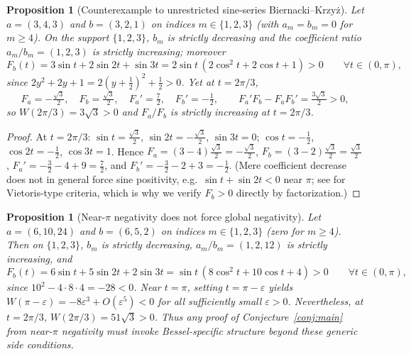 \documentclass[11pt]{article}
\newtheorem{proposition}[theorem]{Proposition}
\theoremstyle{remark}
\begin{document}
\begin{proposition}[Counterexample to unrestricted sine-series Biernacki--Krzy\.z]
\label{prop:counter}
Let $a = (3, 4, 3)$ and $b = (3, 2, 1)$ on indices $m \in \{1,2,3\}$ (with $a_m = b_m = 0$
for $m \ge 4$). On the support $\{1,2,3\}$, $b_m$ is strictly decreasing and the coefficient
ratio $a_m/b_m = (1,2,3)$ is strictly increasing; moreover
\[
F_b(t) = 3\sin t + 2\sin 2t + \sin 3t
= 2\sin t\,(2\cos^2 t + 2\cos t + 1) > 0 \qquad \forall t \in (0,\pi),
\]
since $2y^2 + 2y + 1 = 2(y + \tfrac{1}{2})^2 + \tfrac{1}{2} > 0$. Yet at $t = 2\pi/3$,
\[
F_a = -\tfrac{\sqrt{3}}{2},\quad
F_b = \tfrac{\sqrt{3}}{2},\quad
F_a' = \tfrac{7}{2},\quad
F_b' = -\tfrac{1}{2},
\qquad
F_a' F_b - F_a F_b' = \tfrac{3\sqrt{3}}{2} > 0,
\]
so $W(2\pi/3) = 3\sqrt{3} > 0$ and $F_a/F_b$ is strictly \emph{increasing} at $t = 2\pi/3$.
\end{proposition}

\begin{proof}
At $t = 2\pi/3$: $\sin t = \tfrac{\sqrt{3}}{2}$, $\sin 2t = -\tfrac{\sqrt{3}}{2}$,
$\sin 3t = 0$; $\cos t = -\tfrac{1}{2}$, $\cos 2t = -\tfrac{1}{2}$, $\cos 3t = 1$.
Hence $F_a = (3-4)\tfrac{\sqrt{3}}{2} = -\tfrac{\sqrt{3}}{2}$,
$F_b = (3-2)\tfrac{\sqrt{3}}{2} = \tfrac{\sqrt{3}}{2}$,
$F_a' = -\tfrac{3}{2} - 4 + 9 = \tfrac{7}{2}$, and
$F_b' = -\tfrac{3}{2} - 2 + 3 = -\tfrac{1}{2}$.
(Mere coefficient decrease does not in general force sine positivity, e.g.\
$\sin t + \sin 2t < 0$ near $\pi$; see \cite{AskeySteinig} for Vietoris-type criteria,
which is why we verify $F_b > 0$ directly by factorization.)
\end{proof}

\begin{proposition}[Near-$\pi$ negativity does not force global negativity]
\label{prop:local-global}
Let $a = (6, 10, 24)$ and $b = (6, 5, 2)$ on indices $m \in \{1,2,3\}$ (zero for $m \ge 4$).
Then on $\{1,2,3\}$, $b_m$ is strictly decreasing, $a_m/b_m = (1, 2, 12)$ is strictly
increasing, and
\[
F_b(t) = 6\sin t + 5\sin 2t + 2\sin 3t
= \sin t\,(8\cos^2 t + 10\cos t + 4) > 0 \qquad \forall t \in (0,\pi),
\]
since $10^2 - 4\cdot 8\cdot 4 = -28 < 0$. Near $t = \pi$, setting $t = \pi - \varepsilon$
yields $W(\pi - \varepsilon) = -8\varepsilon^3 + O(\varepsilon^5) < 0$ for all
sufficiently small $\varepsilon > 0$. Nevertheless, at $t = 2\pi/3$,
$W(2\pi/3) = 51\sqrt{3} > 0$. Thus any proof of Conjecture~\ref{conj:main} from near-$\pi$
negativity must invoke Bessel-specific structure beyond these generic side conditions.
\end{proposition}
\end{document}
